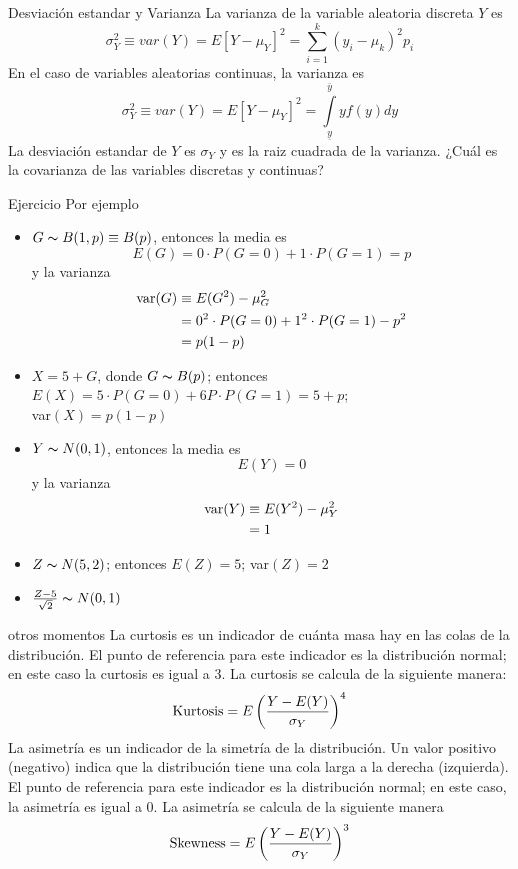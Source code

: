 \begin{frame}{Desviación estandar y Varianza}
	La varianza de la variable aleatoria discreta $Y$ es $$\sigma_{Y}^{2} \equiv var(Y) = E[Y-\mu_{Y}]^2 = \sum_{i=1}^{k}(y_{i}-\mu_{k})^2p_{i}$$ En el caso de variables aleatorias continuas, la varianza es $$\sigma_{Y}^{2} \equiv var(Y) = E[Y-\mu_{Y}]^2 = \int \limits_{\underline{y}}^{\bar{y}}yf(y)dy$$ La desviación estandar de $Y$ es $\sigma_{Y}$ y es la raiz cuadrada de la varianza. ¿Cuál es la covarianza de las variables discretas y continuas?
\end{frame}
\begin{frame}{Ejercicio}
	Por ejemplo
	\begin{itemize}
		\item $G \thicksim B(1,p) \equiv B(p)$, entonces la media es $$E(G) = 0 \cdot  P(G=0) + 1 \cdot P(G=1)=p$$ y la varianza
		\begin{align*}
			\textup{var}(G) & \equiv E(G^2)-\mu_{G}^{2}\\
			& = 0^2 \cdot P(G=0)+1^2\cdot P(G=1)-p^2\\
			& = p(1-p)
		\end{align*}
		\item $X=5+G$, donde $G \thicksim B(p)$; entonces\\
		$E(X)=5\cdot P(G=0)+6P\cdot P(G=1)=5+p$;\\
		var$(X)= p(1-p)$
	\end{itemize}
\end{frame}
\begin{frame}
	\begin{itemize}
		\item $Y \thicksim N(0,1)$, entonces la media es $$E(Y)=0$$ y la varianza
		\begin{align*}
			\textup{var}(Y) & \equiv E(Y^2) - \mu_{Y}^{2}\\
			& = 1 
		\end{align*}
		\item $Z \thicksim N(5,2)$; entonces $E(Z)=5$; var$(Z)=2$
		\item $\frac{Z-5}{\sqrt{2}}\thicksim N(0,1)$
	\end{itemize}
\end{frame}
\begin{frame}{otros momentos}
	La curtosis es un indicador de cuánta masa hay en las colas de la distribución. El punto de referencia para este indicador es la distribución normal; en este caso la curtosis es igual a 3. La curtosis se calcula de la siguiente manera:
	$$\textup{Kurtosis} = E\left( \frac{Y-E(Y)}{\sigma_{Y}}\right)^4$$
	La asimetría es un indicador de la simetría de la distribución. Un valor positivo (negativo) indica que la distribución tiene una cola larga a la derecha (izquierda). El punto de referencia para este indicador es la distribución normal; en este caso, la asimetría es igual a 0. La asimetría se calcula de la siguiente manera
	$$\textup{Skewness} = E\left( \frac{Y-E(Y)}{\sigma_{Y}}\right)^3$$
\end{frame}
